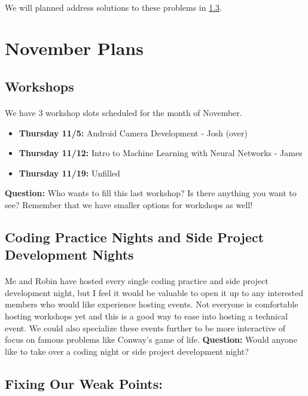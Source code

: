 \documentclass{article}
\begin{document}
\paragraph{}
We will planned address solutions to these problems in \ref{db}.
\section{November Plans}
\subsection{Workshops}
\paragraph{}
We have 3 workshop slots scheduled for the month of November.
\begin{itemize}
    \item \textbf{Thursday 11/5:} Android Camera Development - Josh (over)
    \item \textbf{Thursday 11/12:} Intro to Machine Learning with Neural Networks - James
    \item \textbf{Thursday 11/19:} Unfilled
\end{itemize}
\noindent
\textbf{Question:} Who wants to fill this last workshop? Is there anything you want to see? Remember that we have smaller options for workshops as well! 


\newpage
\subsection{Coding Practice Nights and Side Project Development Nights}
\paragraph{}
Me and Robin have hosted every single coding practice and side project development night, but I feel it would be valuable to open it up to any interested members who would like experience hosting events. Not everyone is comfortable hosting workshops yet and this is a good way to ease into hosting a technical event. We could also specialize these events further to be more interactive of focus on famous problems like Conway's game of life.
\newline\newline\noindent
\textbf{Question:} Would anyone like to take over a coding night or side project development night? 

\subsection{Fixing Our Weak Points:}\label{db}
\end{document}
